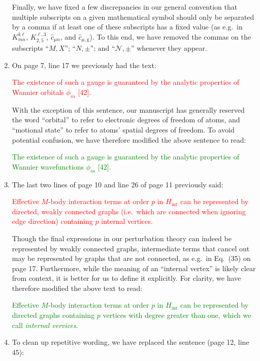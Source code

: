 \documentclass[preprint]{revtex4-1}
\renewcommand{\t}{\text} %
\newcommand{\g}{\text{g}}
\renewcommand{\c}{\hat{c}}
\newcommand{\N}{\mathcal{N}}
\newcommand{\1}{\mathds{1}}
\newcommand{\red}[1]{\textcolor{red}{#1}}
\newcommand{\green}[1]{\textcolor{green}{#1}}
\begin{document}
\begin{enumerate}[label=(R3.\arabic*)]
  Finally, we have fixed a few discrepancies in our general convention
  that multiple subscripts on a given mathematical symbol should only
  be separated by a comma if at least one of these subscripts has a
  fixed value (as e.g.~in $K^{k\ell}_{mn}$, $K^{\ell,3}_{2,5}$,
  $\c_{\mu n}$, and $\c_{\mu,\g}$).  To this end, we have removed the
  commas on the subscripts ``$M,X$''; ``$N,\pm$''; and ``$\N,\pm$''
  whenever they appear.


\item On page 7, line 17 we previously had the text:

  \red{The existence of such a gauge is guaranteed by the analytic
    properties of Wannier orbitals $\phi_{in}$ [42].}

  With the exception of this sentence, our manuscript has generally
  reserved the word ``orbital'' to refer to electronic degrees of
  freedom of atoms, and ``motional state'' to refer to atoms' spatial
  degrees of freedom.  To avoid potential confusion, we have therefore
  modified the above sentence to read:

  \green{The existence of such a gauge is guaranteed by the analytic
    properties of Wannier wavefunctions $\phi_{in}$ [42].}


\item The last two lines of page 10 and line 26 of page 11 previously
  said:

  \red{Effective $M$-body interaction terms at order $p$ in
    $H_{\t{int}}$ can be represented by directed, weakly connected
    graphs (i.e.~which are connected when ignoring edge direction)
    containing $p$ internal vertices.}

  Though the final expressions in our perturbation theory can indeed
  be represented by weakly connected graphs, intermediate terms that
  cancel out may be represented by graphs that are not connected, as
  e.g.~in Eq.~(35) on page 17.  Furthermore, while the meaning of an
  ``internal vertex'' is likely clear from context, it is better for
  us to define it explicitly.  For clarity, we have therefore modified
  the above text to read:

  \green{Effective $M$-body interaction terms at order $p$ in
    $H_{\t{int}}$ can be represented by directed graphs containing $p$
    vertices with degree greater than one, which we call {\it internal
      vervices}.}


\item To clean up repetitive wording, we have replaced the sentence
  (page 12, line 45):


\end{enumerate}
\end{document}
